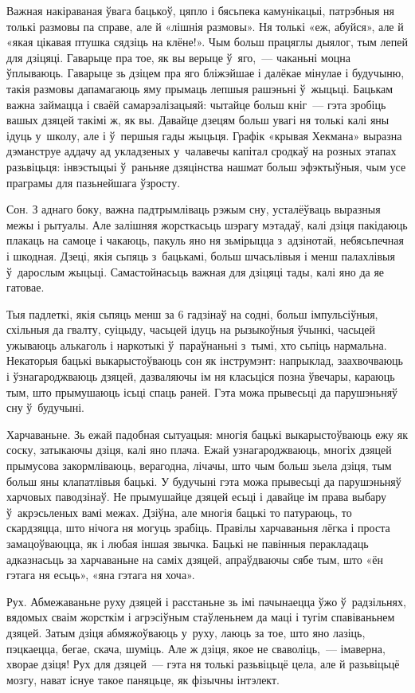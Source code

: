 Важная накіраваная ўвага бацькоў, цяпло і бясьпека камунікацыі, патрэбныя ня толькі размовы па справе, але й «лішнія размовы». Ня толькі «еж, абуйся», але й «якая цікавая птушка сядзіць на клёне!». Чым больш працяглы дыялог, тым лепей для дзіцяці. Гаварыце пра тое, як вы верыце ў~яго,~--- чаканьні моцна ўплываюць. Гаварыце зь дзіцем пра яго бліжэйшае і далёкае мінулае і будучыню, такія размовы дапамагаюць яму прымаць лепшыя рашэньні ў~жыцьці. Бацькам важна займацца і сваёй самарэалізацыяй: чытайце больш кніг~--- гэта зробіць вашых дзяцей такімі ж, як вы. Давайце дзецям больш увагі ня толькі калі яны ідуць у~школу, але і ў~першыя гады жыцьця. Графік «крывая Хекмана» выразна дэманструе аддачу ад укладзеных у~чалавечы капітал сродкаў на розных этапах разьвіцьця: інвэстыцыі ў~раньняе дзяцінства нашмат больш эфэктыўныя, чым усе праграмы для пазьнейшага ўзросту.

Сон. З аднаго боку, важна падтрымліваць рэжым сну, усталёўваць выразныя межы і рытуалы. Але залішняя жорсткасьць шэрагу мэтадаў, калі дзіця пакідаюць плакаць на самоце і чакаюць, пакуль яно ня зьмірыцца з~адзінотай, небясьпечная і шкодная. Дзеці, якія сьпяць з~бацькамі, больш шчасьлівыя і менш палахлівыя ў~дарослым жыцьці. Самастойнасьць важная для дзіцяці тады, калі яно да яе гатовае.

Тыя падлеткі, якія сьпяць менш за 6 гадзінаў на содні, больш імпульсіўныя, схільныя да гвалту, суіцыду, часьцей ідуць на рызыкоўныя ўчынкі, часьцей ужываюць алькаголь і наркотыкі ў~параўнаньні з~тымі, хто сьпіць нармальна. Некаторыя бацькі выкарыстоўваюць сон як інструмэнт: напрыклад, заахвочваюць і ўзнагароджваюць дзяцей, дазваляючы ім ня класьціся позна ўвечары, караюць тым, што прымушаюць ісьці спаць раней. Гэта можа прывесьці да парушэньняў сну ў~будучыні.

Харчаваньне. Зь ежай падобная сытуацыя: многія бацькі выкарыстоўваюць ежу як соску, затыкаючы дзіця, калі яно плача. Ежай узнагароджваюць, многіх дзяцей прымусова закормліваюць, верагодна, лічачы, што чым больш зьела дзіця, тым больш яны клапатлівыя бацькі. У будучыні гэта можа прывесьці да парушэньняў харчовых паводзінаў. Не прымушайце дзяцей есьці і давайце ім права выбару ў~акрэсьленых вамі межах. Дзіўна, але многія бацькі то патураюць, то скардзяцца, што нічога ня могуць зрабіць. Правілы харчаваньня лёгка і проста замацоўваюцца, як і любая іншая звычка. Бацькі не павінныя перакладаць адказнасьць за харчаваньне на саміх дзяцей, апраўдваючы сябе тым, што «ён гэтага ня есьць», «яна гэтага ня хоча».

Рух. Абмежаваньне руху дзяцей і расстаньне зь імі пачынаецца ўжо ў~радзільнях, вядомых сваім жорсткім і агрэсіўным стаўленьнем да маці і тугім спавіваньнем дзяцей. Затым дзіця абмяжоўваюць у~руху, лаюць за тое, што яно лазіць, пэцкаецца, бегае, скача, шуміць. Але ж дзіця, якое не сваволіць,~--- імаверна, хворае дзіця! Рух для дзяцей~--- гэта ня толькі разьвіцьцё цела, але й разьвіцьцё мозгу, нават існуе такое паняцьце, як фізычны інтэлект.

